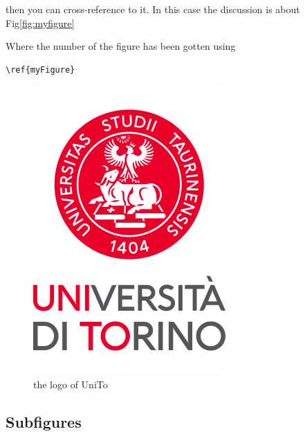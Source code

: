 then you can cross-reference to it.
In this case the discussion is about Fig\ref{fig:myfigure}

Where the number of the figure has been gotten using
\begin{verbatim} 
\ref{myFigure}
\end{verbatim}


\begin{figure}[htb]
	\centering

	\includegraphics[scale=0.15]{pictures/logo.png}
	\caption{the logo of UniTo}

\end{figure}

\subsection{Subfigures}

